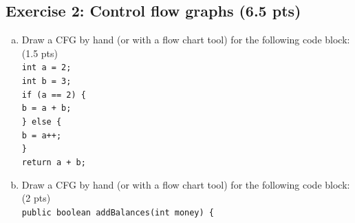 \documentclass [11pt, a4wide, twoside]{article}
\begin{document}
\subsection*{Exercise 2: Control flow graphs (6.5 pts)}
\begin{enumerate}[a)]
\item Draw a CFG by hand (or with a flow chart tool) for the following code block: (1.5 pts)\\
\texttt{int a = 2;\\
int b = 3;\\
if (a == 2) \{\\
\hspace*{0.5cm}b = a + b;\\
\} else \{\\
\hspace*{0.5cm}b = a++;\\
\}\\
return a + b;}\\
\item Draw a CFG by hand (or with a flow chart tool) for the following code block: (2 pts)\\
\texttt{public boolean addBalances(int money) \{\\
}
\end{enumerate}
\end{document}
